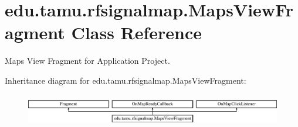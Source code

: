 \hypertarget{classedu_1_1tamu_1_1rfsignalmap_1_1_maps_view_fragment}{}\section{edu.\+tamu.\+rfsignalmap.\+Maps\+View\+Fragment Class Reference}
\label{classedu_1_1tamu_1_1rfsignalmap_1_1_maps_view_fragment}


Maps View Fragment for Application Project.  


Inheritance diagram for edu.\+tamu.\+rfsignalmap.\+Maps\+View\+Fragment\+:\begin{figure}[H]
\begin{center}
\leavevmode
\includegraphics[height=1.458333cm]{classedu_1_1tamu_1_1rfsignalmap_1_1_maps_view_fragment}
\end{center}
\end{figure}
